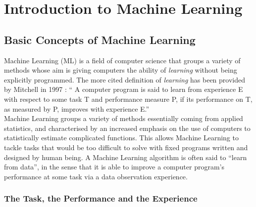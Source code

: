 
\chapter{Introduction to Machine Learning} %

\label{ChapterIntroML}


\section{Basic Concepts of Machine Learning}
Machine Learning (ML) is a field of computer science that groups a variety of  methods whose aim is giving computers the ability of \emph{learning} without being explicitly programmed. The more cited definition of \emph{learning} has been provided by Mitchell in 1997 \cite{Mitchell1997}: \enquote{ A computer program is said to learn from experience E with respect to some task T and performance measure P, if its performance on T, as measured by P, improves with experience E.} \\
Machine Learning groups a variety of methods essentially coming from applied statistics, and characterised by an increased emphasis on the use of computers to statistically estimate complicated functions. This allows Machine Learning to tackle tasks that would be too difficult to solve with fixed programs written and designed by human being. A Machine Learning algorithm is often said to \enquote{learn from data}, in the sense that it is able to improve a computer program's performance at some task via a data observation experience.

\subsection{The Task, the Performance and the Experience}
